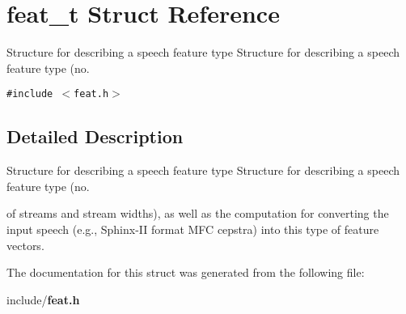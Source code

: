 \section{feat\_\-t Struct Reference}
\label{structfeat__t}
Structure for describing a speech feature type Structure for describing a speech feature type (no.  


{\tt \#include $<$feat.h$>$}



\subsection{Detailed Description}
Structure for describing a speech feature type Structure for describing a speech feature type (no. 

of streams and stream widths), as well as the computation for converting the input speech (e.g., Sphinx-II format MFC cepstra) into this type of feature vectors. 

The documentation for this struct was generated from the following file:\begin{CompactItemize}
\item 
include/{\bf feat.h}\end{CompactItemize}
